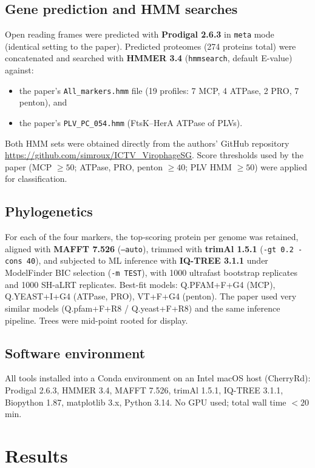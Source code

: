 \documentclass[11pt,a4paper]{article}
\begin{document}
\subsection{Gene prediction and HMM searches}
Open reading frames were predicted with \textbf{Prodigal 2.6.3} in
\texttt{meta} mode (identical setting to the paper). Predicted proteomes
(274 proteins total) were concatenated and searched with
\textbf{HMMER 3.4} (\texttt{hmmsearch}, default E-value) against:
\begin{itemize}[leftmargin=1.4em]
  \item the paper's \texttt{All\_markers.hmm} file (19 profiles: 7 MCP,
        4 ATPase, 2 PRO, 7 penton), and
  \item the paper's \texttt{PLV\_PC\_054.hmm} (FtsK--HerA ATPase of PLVs).
\end{itemize}
Both HMM sets were obtained directly from the authors' GitHub repository
\url{https://github.com/simroux/ICTV_VirophageSG}. Score thresholds used by
the paper (MCP $\geq 50$; ATPase, PRO, penton $\geq 40$; PLV HMM $\geq 50$)
were applied for classification.

\subsection{Phylogenetics}
For each of the four markers, the top-scoring protein per genome was
retained, aligned with \textbf{MAFFT 7.526} (\texttt{--auto}), trimmed with
\textbf{trimAl 1.5.1} (\texttt{-gt~0.2 -cons~40}), and subjected to
ML inference with \textbf{IQ-TREE 3.1.1} under ModelFinder BIC selection
(\texttt{-m TEST}), with 1000 ultrafast bootstrap replicates and 1000
SH-aLRT replicates. Best-fit models: Q.PFAM+F+G4 (MCP),
Q.YEAST+I+G4 (ATPase, PRO), VT+F+G4 (penton). The paper used very similar
models (Q.pfam+F+R8 / Q.yeast+F+R8) and the same inference pipeline.
Trees were mid-point rooted for display.

\subsection{Software environment}
All tools installed into a Conda environment on an Intel macOS host
(CherryRd):
Prodigal 2.6.3, HMMER 3.4, MAFFT 7.526, trimAl 1.5.1, IQ-TREE 3.1.1,
Biopython 1.87, matplotlib 3.x, Python 3.14. No GPU used; total wall time
$<\!20$\,min.

\section{Results}
\end{document}

